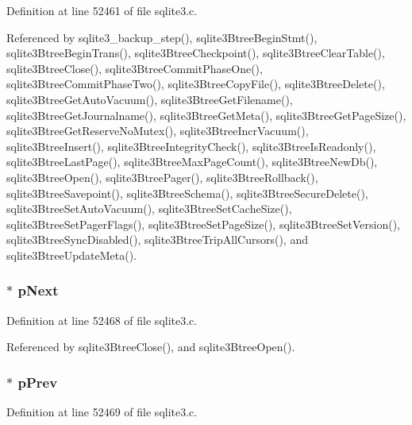 Definition at line 52461 of file sqlite3.\+c.



Referenced by sqlite3\+\_\+backup\+\_\+step(), sqlite3\+Btree\+Begin\+Stmt(), sqlite3\+Btree\+Begin\+Trans(), sqlite3\+Btree\+Checkpoint(), sqlite3\+Btree\+Clear\+Table(), sqlite3\+Btree\+Close(), sqlite3\+Btree\+Commit\+Phase\+One(), sqlite3\+Btree\+Commit\+Phase\+Two(), sqlite3\+Btree\+Copy\+File(), sqlite3\+Btree\+Delete(), sqlite3\+Btree\+Get\+Auto\+Vacuum(), sqlite3\+Btree\+Get\+Filename(), sqlite3\+Btree\+Get\+Journalname(), sqlite3\+Btree\+Get\+Meta(), sqlite3\+Btree\+Get\+Page\+Size(), sqlite3\+Btree\+Get\+Reserve\+No\+Mutex(), sqlite3\+Btree\+Incr\+Vacuum(), sqlite3\+Btree\+Insert(), sqlite3\+Btree\+Integrity\+Check(), sqlite3\+Btree\+Is\+Readonly(), sqlite3\+Btree\+Last\+Page(), sqlite3\+Btree\+Max\+Page\+Count(), sqlite3\+Btree\+New\+Db(), sqlite3\+Btree\+Open(), sqlite3\+Btree\+Pager(), sqlite3\+Btree\+Rollback(), sqlite3\+Btree\+Savepoint(), sqlite3\+Btree\+Schema(), sqlite3\+Btree\+Secure\+Delete(), sqlite3\+Btree\+Set\+Auto\+Vacuum(), sqlite3\+Btree\+Set\+Cache\+Size(), sqlite3\+Btree\+Set\+Pager\+Flags(), sqlite3\+Btree\+Set\+Page\+Size(), sqlite3\+Btree\+Set\+Version(), sqlite3\+Btree\+Sync\+Disabled(), sqlite3\+Btree\+Trip\+All\+Cursors(), and sqlite3\+Btree\+Update\+Meta().

\hypertarget{struct_btree_a685ec01d7281c1aee9e1621da9fdc6e6}{}
\subsubsection[{p\+Next}]{$\ast$ p\+Next}\label{struct_btree_a685ec01d7281c1aee9e1621da9fdc6e6}


Definition at line 52468 of file sqlite3.\+c.



Referenced by sqlite3\+Btree\+Close(), and sqlite3\+Btree\+Open().

\hypertarget{struct_btree_a5073b2001300b8d13b12d202d174569d}{}
\subsubsection[{p\+Prev}]{$\ast$ p\+Prev}\label{struct_btree_a5073b2001300b8d13b12d202d174569d}


Definition at line 52469 of file sqlite3.\+c.



